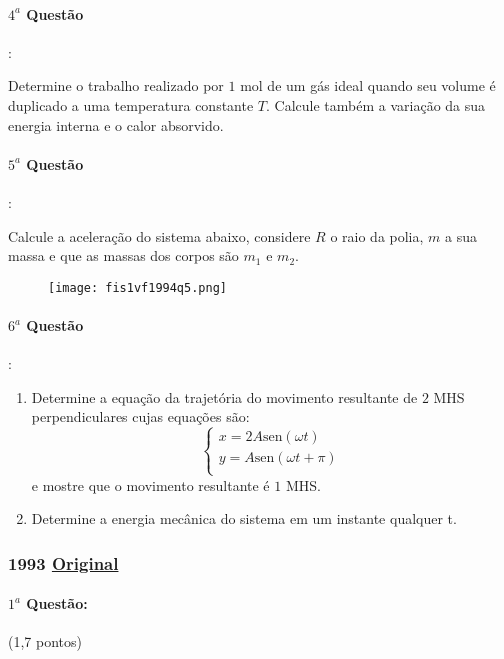 \documentclass[12pt,a4paper]{article}
\newcommand{\sen}{\mathrm{sen}}
\newcommand{\original}[1]{\tiny \href{#1}{Original} \normalsize}
\begin{document}
\paragraph{$4^a$ Questão}:

Determine o trabalho realizado por $1$ mol de um gás ideal quando seu volume é duplicado a uma temperatura constante $T$. 
Calcule também a variação da sua energia interna e o calor absorvido.
\vspace{0.1cm}

\paragraph{$5^a$ Questão}:

Calcule a aceleração do sistema abaixo, considere $R$ o raio da polia, $m$ a sua massa e que as massas dos corpos são $m_1$ e $m_2$.

\begin{figure}[ht]
\centering
\texttt{[image: fis1vf1994q5.png]}
\end{figure}

\paragraph{$6^a$ Questão}:

\begin{enumerate}[label=\alph*)]
\item Determine a equação da trajetória do movimento resultante de $2$ MHS perpendiculares cujas equações são:
$$ 
\begin{cases}
x= 2A \sen (\omega t) \\
y=A \sen (\omega t + \pi) \\
\end{cases}
$$
e mostre que o movimento resultante é $1$ MHS.
\item Determine a energia mecânica do sistema em um instante qualquer t.
\end{enumerate}

\newpage
\subsubsection{1993 \original{https://drive.google.com/file/d/1fJB1r5D1oCB8G3Jm4nvZbKr295wHFdf0/view?usp=sharing}}

\paragraph{$1^a$ Questão:} (1,7 pontos)
\end{document}
